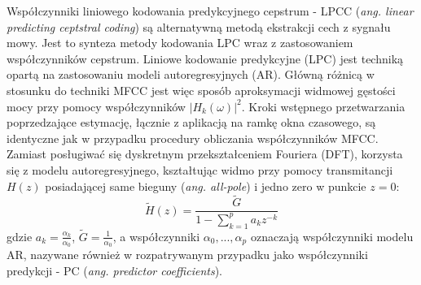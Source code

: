 Współczynniki liniowego kodowania predykcyjnego cepstrum - LPCC (\textit{ang. linear predicting ceptstral coding}) są alternatywną metodą ekstrakcji cech z sygnału mowy. Jest to synteza metody kodowania LPC wraz z zastosowaniem współczynników cepstrum. Liniowe kodowanie predykcyjne (LPC) jest techniką opartą na zastosowaniu modeli autoregresyjnych (AR). Główną różnicą w stosunku do techniki MFCC jest więc sposób aproksymacji widmowej gęstości mocy przy pomocy współczynników $|H_k(\omega)|^2$.
Kroki wstępnego przetwarzania poprzedzające estymację, łącznie z aplikacją na ramkę okna czasowego, są identyczne jak w przypadku procedury obliczania współczynników MFCC. Zamiast posługiwać się dyskretnym przekształceniem Fouriera (DFT), korzysta się z modelu autoregresyjnego, kształtując widmo przy pomocy transmitancji $H(z)$ posiadającej same bieguny (\textit{ang. all-pole}) i jedno zero w punkcie $z = 0$:
\begin{equation}
  \label{transar}
  \tilde{H}(z) = \frac{\tilde{G}}{1-\sum_{k=1}^{p} a_k z^{-k}}
\end{equation}
gdzie $ a_k = \frac{\alpha_k}{\alpha_0} $, $\tilde{G} = \frac{1}{\alpha_0}$, a współczynniki $\alpha_0,...,\alpha_p$ oznaczają współczynniki modelu AR, nazywane również w rozpatrywanym przypadku jako współczynniki predykcji - PC (\textit{ang. predictor coefficients}).

